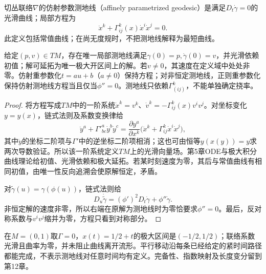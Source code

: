 \begin{definition}[仿射测地线]
切丛联络$\nabla$的仿射参数测地线（affinely parametrized geodesic）是满足$D_t\dot\gamma=0$的光滑曲线；局部方程为
\[
 \ddot x^k+\Gamma^k_{ij}(x)\dot x^i\dot x^j=0.
\]
此定义包括常值曲线；在尚无度规时，不把测地线解释为最短曲线。
\end{definition}

\begin{theorem}\label{thm:affine-geodesics}
给定$(p,v)\in TM$，存在唯一局部测地线满足$\gamma(0)=p,\dot\gamma(0)=v$，并光滑依赖初值；解可延拓为唯一极大开区间上的解。若$v\ne0$，其速度在定义域中处处非零。仿射重参数化$t=au+b$（$a\ne0$）保持方程；对非恒定测地线，正则重参数化保持仿射测地线方程当且仅当$\phi''=0$。测地线只依赖$\Gamma^k_{(ij)}$，不能单独确定挠率。
\end{theorem}
\begin{proof}
将方程写成$TM$中的一阶系统$\dot x^k=v^k$、$\dot v^k=-\Gamma^k_{ij}(x)v^iv^j$。对坐标变化$y=y(x)$，链式法则及系数变换律给
\[
 \ddot y^a+\Gamma'^a_{bc}\dot y^b\dot y^c
 =\frac{\partial y^a}{\partial x^k}
   \bigl(\ddot x^k+\Gamma^k_{ij}\dot x^i\dot x^j\bigr),
\]
其中$\ddot y$的坐标二阶项与$\Gamma'$中的逆坐标二阶项相消；这也可由恒等$y(x(y))=y$求两次导数验证。所以该一阶系统定义$TM$上的光滑向量场。第5章ODE与极大积分曲线理论给初值、光滑依赖和极大延拓。若某时刻速度为零，其后与常值曲线有相同初值，由唯一性反向追溯会使原解恒定，矛盾。

对$\widetilde\gamma(u)=\gamma(\phi(u))$，链式法则给
\[
 D_u\dot{\widetilde\gamma}=(\phi')^2D_t\dot\gamma+\phi''\dot\gamma.
\]
非恒定解的速度非零，所以右端在原解为测地线时为零恰要求$\phi''=0$。最后，反对称系数与$v^iv^j$缩并为零，方程只看到对称部分。
\end{proof}
\begin{example}[测地线不一定在所有时间存在]
在$M=(0,1)$取$\Gamma=0$，$x(t)=1/2+t$的极大区间是$(-1/2,1/2)$；联络系数光滑且曲率为零，并未阻止曲线离开流形。平行移动沿每条已经给定的紧时间路径都能完成，不表示测地线对任意时间均有定义。完备性、指数映射及长度变分留到第12章。
\end{example}
